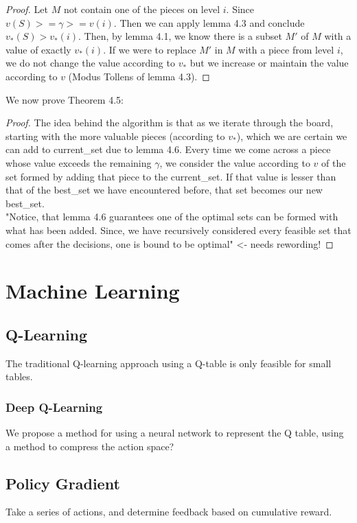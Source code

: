 \documentclass{article}
\theoremstyle{plain}
\theoremstyle{definition}
\theoremstyle{remark}
\begin{document}
\begin{proof}
Let $M$ not contain one of the pieces on level $i$. Since $v(S) >= \gamma >= v(i)$. Then we can apply lemma 4.3 and conclude $v_{*}(S) > v_{*}(i)$. Then, by lemma 4.1, we know there is a subset $M'$ of $M$ with a value of exactly $v_{*}(i)$. If we were to replace $M'$ in $M$ with a piece from level $i$, we do not change the value according to $v_{*}$ but we increase or maintain the value according to $v$ (Modus Tollens of lemma 4.3). 
\end{proof}

We now prove Theorem 4.5:

\begin{proof}
The idea behind the algorithm is that as we iterate through the board, starting with the more valuable pieces (according to $v_{*}$), which we are certain we can add to current\_set due to lemma 4.6. Every time we come across a piece whose value exceeds the remaining $\gamma$, we consider the value according to $v$ of the set formed by adding that piece to the current\_set. If that value is lesser than that of the best\_set we have encountered before, that set  becomes our new best\_set. \\

"Notice, that lemma 4.6 guarantees one of the optimal sets can be formed with what has been added. Since, we have recursively considered every feasible set that comes after the decisions, one is bound to be optimal"  <- needs rewording!
\end{proof}

\section{Machine Learning}
\subsection{Q-Learning}
The traditional Q-learning approach using a Q-table is only feasible for small tables.
\subsubsection{Deep Q-Learning}
We propose a method for using a neural network to represent the Q table, using a method to compress the action space?

\subsection{Policy Gradient}
Take a series of actions, and determine feedback based on cumulative reward.
\end{document}
